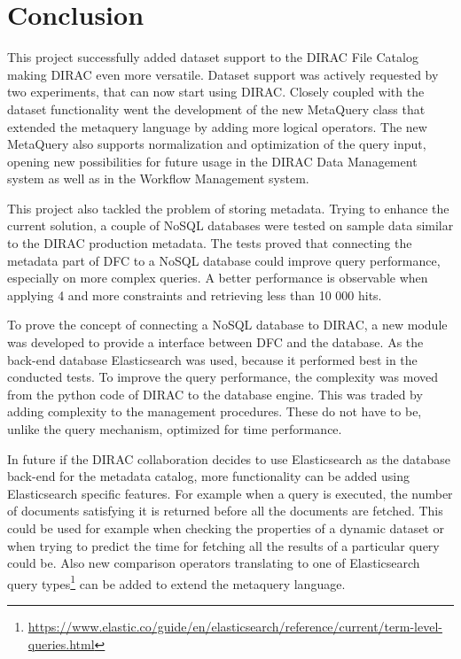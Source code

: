 \chapter*{Conclusion}
\label{chap:conc}

This project successfully added dataset support to the DIRAC File Catalog making DIRAC even more 
versatile. Dataset support was actively requested by two experiments, that can now start using DIRAC. 
Closely coupled with the dataset functionality went the development of the new MetaQuery
class that extended the metaquery language by adding more logical operators. The new MetaQuery also
supports normalization and optimization of the query input, opening new possibilities for future usage
in the DIRAC Data Management system as well as in the Workflow Management system. 

This project also tackled the problem of storing metadata. Trying to enhance the current solution, a couple of NoSQL 
databases were tested on sample data similar to the DIRAC production metadata. The tests proved that connecting the 
metadata part of DFC to a NoSQL database could improve query performance, especially on more complex
queries. A better performance is observable when applying 4 and more constraints and retrieving less than 10 000 
hits.

To prove the concept of connecting a NoSQL database to DIRAC, a new module was developed to provide 
a interface between DFC and the database. As the back-end database Elasticsearch was used, because it performed
best in the conducted tests. To improve the query performance, the complexity was moved from the python code of
DIRAC to the database engine. This was traded by adding complexity to the management procedures. These do not have 
to be, unlike the query mechanism, optimized for time performance.

In future if the DIRAC collaboration decides to use Elasticsearch as the database back-end for the metadata
catalog, more functionality can be added using Elasticsearch specific features. 
For example when a query is executed, the number of documents satisfying it is returned before all the documents are 
fetched. This could be used for example when checking the properties of a dynamic dataset or when trying to predict
the time for fetching all the results of a particular query could be. Also new comparison 
operators translating to one of Elasticsearch query 
types\footnote{\url{https://www.elastic.co/guide/en/elasticsearch/reference/current/term-level-queries.html}} can be 
added to extend the metaquery language.